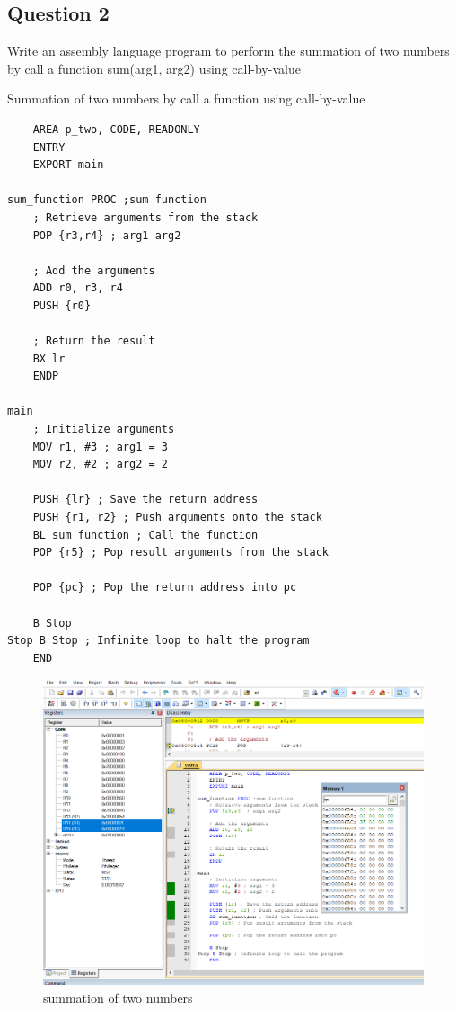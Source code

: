 \documentclass[11pt]{article}
\begin{document}
\subsection{Question 2}
Write an assembly language program to perform the summation of two numbers by call a function sum(arg1, arg2) using call-by-value\\
\begin{listing}[h]
    \caption{Summation of two numbers by call a function using call-by-value}
    \begin{verbatim}
    AREA p_two, CODE, READONLY
    ENTRY
    EXPORT main
        
sum_function PROC ;sum function 
    ; Retrieve arguments from the stack
    POP {r3,r4} ; arg1 arg2

    ; Add the arguments
    ADD r0, r3, r4
    PUSH {r0}

    ; Return the result
    BX lr
	ENDP

main
    ; Initialize arguments
    MOV r1, #3 ; arg1 = 3
    MOV r2, #2 ; arg2 = 2
    
    PUSH {lr} ; Save the return address
    PUSH {r1, r2} ; Push arguments onto the stack
    BL sum_function ; Call the function
    POP {r5} ; Pop result arguments from the stack

    POP {pc} ; Pop the return address into pc
     
    B Stop
Stop B Stop ; Infinite loop to halt the program
	END
\end{verbatim}
\end{listing}

\clearpage
\begin{figure}[!h]
    \centering
    \includegraphics[width=\textwidth]{prob2.PNG}
    \caption{summation of two numbers}
\end{figure} 
\clearpage
\end{document}
